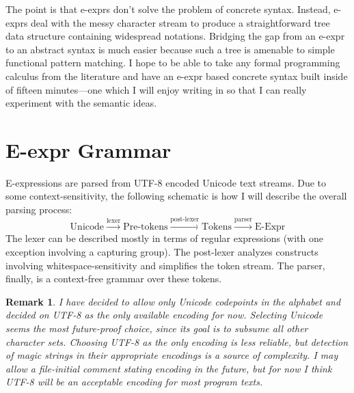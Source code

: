 \documentclass[11pt]{article} %
\newtheorem*{remark}{Remark}
\begin{document}
The point is that e-exprs don't solve the problem of concrete syntax.
Instead, e-exprs deal with the messy character stream to produce a straightforward tree data structure containing widespread notations.
Bridging the gap from an e-expr to an abstract syntax is much easier because such a tree is amenable to simple functional pattern matching.
I hope to be able to take any formal programming calculus from the literature and have an e-expr based concrete syntax built inside of fifteen minutes---one which I will enjoy writing in so that I can really experiment with the semantic ideas.

\section{E-expr Grammar}

E-expressions are parsed from UTF-8 encoded Unicode text streams.
Due to some context-sensitivity, the following schematic is how I will describe the overall parsing process:
$$\text{Unicode}
  \xrightarrow{\text{lexer}} \text{Pre-tokens}
  \xrightarrow{\text{post-lexer}} \text{Tokens}
  \xrightarrow{\text{parser}} \text{E-Expr}
$$
The lexer can be described mostly in terms of regular expressions (with one exception involving a capturing group).
The post-lexer analyzes constructs involving whitespace-sensitivity and simplifies the token stream.
The parser, finally, is a context-free grammar over these tokens.

\begin{remark}
I have decided to allow only Unicode codepoints in the alphabet and decided on UTF-8 as the only available encoding for now.
Selecting Unicode seems the most future-proof choice, since its goal is to subsume all other character sets.
Choosing UTF-8 as the only encoding is less reliable, but detection of magic strings in their appropriate encodings is a source of complexity.
I may allow a file-initial comment stating encoding in the future, but for now I think UTF-8 will be an acceptable encoding for most program texts.
\end{remark}

\newcommand*{\literal}[1]{\texttt{'{#1}'}}
\newcommand*{\notcharclass}[1]{\mathopen{\lnot[\mathord:\;} #1 \mathclose{\;\mathord:]}}
\newcommand*{\charclass}[1]{\mathopen{[\mathord:\;} #1 \mathclose{\;\mathord:]}}
\newcommand*{\charrange}[2]{\literal{#1}\text{--}\literal{#2}}
\end{document}
